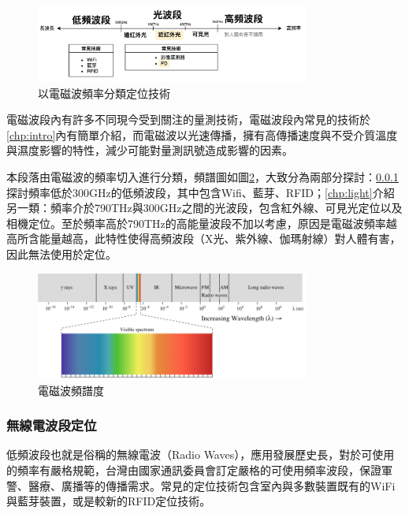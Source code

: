         \begin{figure}[ht]
            \centering
            \includegraphics[width=9cm]{ch2pic/technique_sort.png}
            \caption{以電磁波頻率分類定位技術}
            \label{pic:technique_sort}
        \end{figure}

        電磁波段內有許多不同現今受到關注的量測技術，電磁波段內常見的技術於\ref{chp:intro}內有簡單介紹，而電磁波以光速傳播，擁有高傳播速度與不受介質溫度與濕度影響的特性，減少可能對量測訊號造成影響的因素。

        本段落由電磁波的頻率切入進行分類，頻譜圖如圖\ref{pic:spectrum}，大致分為兩部分探討：\ref{chp:radio}探討頻率低於300GHz的低頻波段\cite{book_electromagnetic}，其中包含Wifi、藍芽、RFID；\ref{chp:light}介紹另一類：頻率介於790THz與300GHz之間的光波段，包含紅外線、可見光定位以及相機定位。至於頻率高於790THz的高能量波段不加以考慮，原因是電磁波頻率越高所含能量越高，此特性使得高頻波段（X光、紫外線、伽瑪射線）對人體有害，因此無法使用於定位。

        \begin{figure}[ht]
            \centering
            \includegraphics[width=9cm]{ch2pic/electro_spectrum.png}
            \caption{電磁波頻譜度\cite{Spectrum}}
            \label{pic:spectrum}
        \end{figure}

        \subsubsection{無線電波段定位}
        \label{chp:radio}
        
            低頻波段也就是俗稱的無線電波（Radio Waves），應用發展歷史長，對於可使用的頻率有嚴格規範，台灣由國家通訊委員會訂定嚴格的可使用頻率波段\cite{rf_law}，保證軍警、醫療、廣播等的傳播需求。常見的定位技術包含室內與多數裝置既有的WiFi與藍芽裝置，或是較新的RFID定位技術。
        
